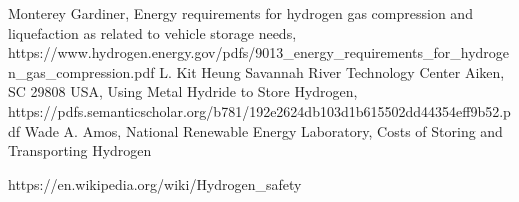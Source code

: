 \begin{thebibliography}{99}
Monterey Gardiner, Energy requirements for hydrogen gas compression and liquefaction as related to vehicle storage needs, https://www.hydrogen.energy.gov/pdfs/9013\_energy\_requirements\_for\_hydrogen\_gas\_compression.pdf
L. Kit Heung Savannah River Technology Center Aiken, SC 29808 USA, Using Metal Hydride to Store Hydrogen, https://pdfs.semanticscholar.org/b781/192e2624db103d1b615502dd44354eff9b52.pdf
Wade A. Amos, National Renewable Energy Laboratory, Costs of Storing and Transporting Hydrogen


https://en.wikipedia.org/wiki/Hydrogen\_safety



\end{thebibliography}










%






